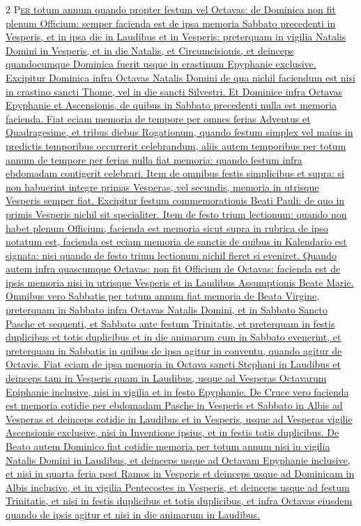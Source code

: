 \begin{multicols*}{2}
{\color{Red} }
\lettrine[lines=2]{\zallmancaps \color{Red} P}{}\ul{\textsc{er} totum annum quando propter festum vel Octavas: de Dominica non fit plenum Officium: semper facienda est de ipsa memoria Sabbato precedenti in Vesperis, et in ipsa die in Laudibus et in Vesperis: preterquam in vigilia Natalis Domini in Vesperis, et in die Natalis, et Circumcisionis, et deinceps quandocumque Dominica fuerit usque in crastinum Epyphanie exclusive. Excipitur Dominica infra Octavas Natalis Domini de qua nichil faciendum est nisi in crastino sancti Thome, vel in die sancti Silvestri. Et Dominice infra Octavas Epyphanie et Ascensionis, de quibus in Sabbato precedenti nulla est memoria facienda.
Fiat eciam memoria de tempore per omnes ferias Adventus et Quadragesime, et tribus diebus Rogationum, quando festum simplex vel maius in predictis temporibus occurrerit celebrandum, aliis autem temporibus per totum annum de tempore per ferias nulla fiat memoria: quando festum infra ebdomadam contigerit celebrari.
Item de omnibus festis simplicibus et supra: si non habuerint integre primas Vesperas, vel secundis, memoria in utrisque Vesperis semper fiat. Excipitur festum commemorationis Beati Pauli: de quo in primis Vesperis nichil sit specialiter. Item de festo trium lectionum: quando non habet plenum Officium, facienda est memoria sicut supra in rubrica de ipso notatum est, facienda est eciam memoria de sanctis de quibus in Kalendario est signata: nisi quando de festo trium lectionum nichil fieret si eveniret. Quando autem infra quascumque Octavas: non fit Officium de Octavas: facienda est de ipsis memoria nisi in utrisque Vesperis et in Laudibus Assumptionis Beate Marie.
Omnibus vero Sabbatis per totum annum fiat memoria de Beata Virgine, preterquam in Sabbato infra Octavas Natalis Domini, et in Sabbato Sancto Pasche et sequenti, et Sabbato ante festum Trinitatis, et preterquam in festis duplicibus et totis duplicibus et in die animarum cum in Sabbato evenerint, et preterquam in Sabbatis in quibus de ipsa agitur in conventu, quando agitur de Octavis.
Fiat eciam de ipsa memoria in Octava sancti Stephani in Laudibus et deinceps tam in Vesperis quam in Laudibus, usque ad Vesperas Octavarum Epiphanie inclusive, nisi in vigilia et in festo Epyphanie.
De Cruce vero facienda est memoria cotidie per ebdomadam Pasche in Vesperis et Sabbato in Albis ad Vesperas et deinceps cotidie in Laudibus et in Vesperis, usque ad Vesperas vigilie Ascensionis exclusive, nisi in Inventione ipsius, et in festis totis duplicibus.
De Beato autem Dominico fiat cotidie memoria per totum annum nisi in vigilia Natalis Domini in Laudibus, et deinceps usque ad Octavam Epyphanie inclusive, et nisi in quarta feria post Ramos in Vesperis et deinceps usque ad Dominicam in Albis inclusive, et in vigilia Pentecostes in Vesperis, et deinceps usque ad festum Trinitatis, et nisi in festis duplicibus et totis duplicibus, et infra Octavas eiusdem quando de ipsis agitur et nisi in die animarum in Laudibus.}


\end{multicols*}
